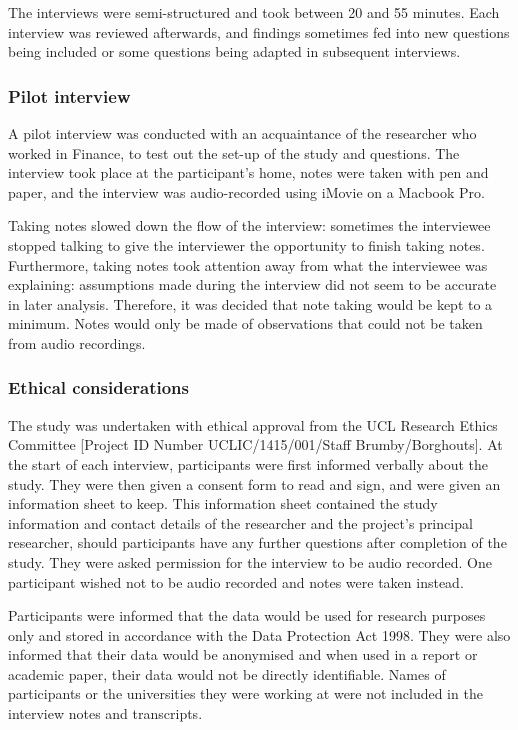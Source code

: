 The interviews were semi-structured and took between 20 and 55 minutes. Each interview was reviewed afterwards, and findings sometimes fed into new questions being included or some questions being adapted in subsequent interviews.

\subsubsection{Pilot interview}
A pilot interview was conducted with an acquaintance of the researcher who worked in Finance, to test out the set-up of the study and questions. The interview took place at the participant's home, notes were taken with pen and paper, and the interview was audio-recorded using iMovie on a Macbook Pro. 

Taking notes slowed down the flow of the interview: sometimes the interviewee stopped talking to give the interviewer the opportunity to finish taking notes. Furthermore, taking notes took attention away from what the interviewee was explaining: assumptions made during the interview did not seem to be accurate in later analysis. Therefore, it was decided that note taking would be kept to a minimum. Notes would only be made of observations that could not be taken from audio recordings.


\subsubsection{Ethical considerations}
The study was undertaken with ethical approval from the UCL Research Ethics Committee [Project ID Number UCLIC/1415/001/Staff Brumby/Borghouts]. 
At the start of each interview, participants were first informed verbally about the study. They were then given a consent form to read and sign, and were given an information sheet to keep. This information sheet contained the study information and contact details of the researcher and the project's principal researcher, should participants have any further questions after completion of the study.  They were asked permission for the interview to be audio recorded. One participant wished not to be audio recorded and notes were taken instead. 

Participants were informed that the data would be used for research purposes only and stored in accordance with the Data Protection Act 1998. They were also informed that their data would be anonymised and when used in a report or academic paper, their data would not be directly identifiable. Names of participants or the universities they were working at were not included in the interview notes and transcripts.
 
